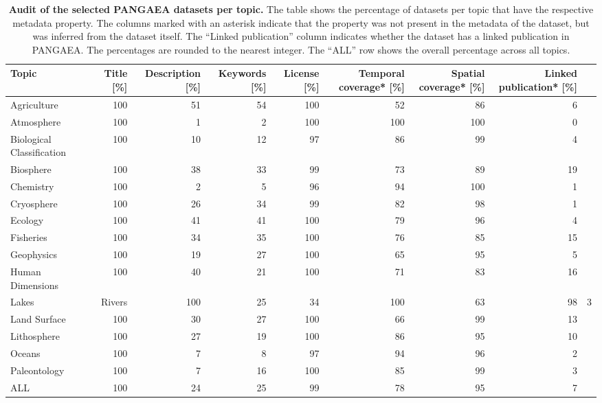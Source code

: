 \begin{table}
\caption{\textbf{Audit of the selected PANGAEA datasets per topic.} The table shows the percentage of datasets per topic that have the respective metadata property. The columns marked with an asterisk indicate that the property was not present in the metadata of the dataset, but was inferred from the dataset itself. The ``Linked publication'' column indicates whether the dataset has a linked publication in PANGAEA. The percentages are rounded to the nearest integer. The ``ALL'' row shows the overall percentage across all topics.}
\label{tab:pangaea_audit}
\begin{tabular}{lrrrrrrr}
\toprule
Topic & Title [\%] & Description [\%] & Keywords [\%] & License [\%] & Temporal coverage* [\%] & Spatial coverage* [\%] & Linked publication* [\%] \\
\midrule
Agriculture & 100 & 51 & 54 & 100 & 52 & 86 & 6 \\
Atmosphere & 100 & 1 & 2 & 100 & 100 & 100 & 0 \\
Biological Classification & 100 & 10 & 12 & 97 & 86 & 99 & 4 \\
Biosphere & 100 & 38 & 33 & 99 & 73 & 89 & 19 \\
Chemistry & 100 & 2 & 5 & 96 & 94 & 100 & 1 \\
Cryosphere & 100 & 26 & 34 & 99 & 82 & 98 & 1 \\
Ecology & 100 & 41 & 41 & 100 & 79 & 96 & 4 \\
Fisheries & 100 & 34 & 35 & 100 & 76 & 85 & 15 \\
Geophysics & 100 & 19 & 27 & 100 & 65 & 95 & 5 \\
Human Dimensions & 100 & 40 & 21 & 100 & 71 & 83 & 16 \\
Lakes & Rivers & 100 & 25 & 34 & 100 & 63 & 98 & 3 \\
Land Surface & 100 & 30 & 27 & 100 & 66 & 99 & 13 \\
Lithosphere & 100 & 27 & 19 & 100 & 86 & 95 & 10 \\
Oceans & 100 & 7 & 8 & 97 & 94 & 96 & 2 \\
Paleontology & 100 & 7 & 16 & 100 & 85 & 99 & 3 \\
ALL & 100 & 24 & 25 & 99 & 78 & 95 & 7 \\
\bottomrule
\end{tabular}
\end{table}
